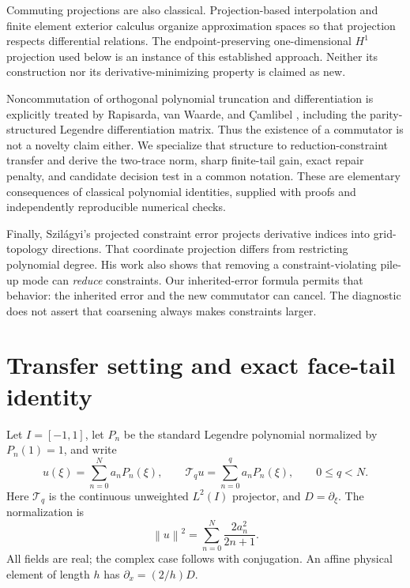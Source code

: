 \documentclass[11pt,a4paper]{article}
\theoremstyle{remark}\newtheorem{remark}[theorem]{Remark}
\newcommand{\norm}[1]{\left\lVert #1\right\rVert}
\newcommand{\T}{\mathcal{T}}
\begin{document}
Commuting projections are also classical. Projection-based interpolation
\cite{demkowicz2005} and finite element exterior calculus \cite{arnold2006}
organize approximation spaces so that projection respects differential
relations. The endpoint-preserving one-dimensional \(H^1\) projection used below
is an instance of this established approach. Neither its construction nor its
derivative-minimizing property is claimed as new.

Noncommutation of orthogonal polynomial truncation and differentiation is
explicitly treated by Rapisarda, van Waarde, and \c{C}amlibel
\cite{rapisarda2024}, including the parity-structured Legendre differentiation
matrix. Thus the existence of a commutator is not a novelty claim either.
We specialize that structure to reduction-constraint transfer and derive the
two-trace norm, sharp finite-tail gain, exact repair penalty, and candidate
decision test in a common notation. These are elementary consequences of
classical polynomial identities, supplied with proofs and independently
reproducible numerical checks.

Finally, Szil\'agyi's projected constraint error \cite[Sec.~6.1.4]{szilagyi2014}
projects derivative indices into grid-topology directions. That coordinate
projection differs from restricting polynomial degree. His work also shows
that removing a constraint-violating pile-up mode can \emph{reduce} constraints.
Our inherited-error formula permits that behavior: the inherited error and the
new commutator can cancel. The diagnostic does not assert that coarsening
always makes constraints larger.

\section{Transfer setting and exact face-tail identity}
\label{sec:identity}
Let \(I=[-1,1]\), let \(P_n\) be the standard Legendre polynomial normalized by
\(P_n(1)=1\), and write
\begin{equation}
 u(\xi)=\sum_{n=0}^{N}a_nP_n(\xi),\qquad
 \T_q u=\sum_{n=0}^{q}a_nP_n(\xi),\qquad 0\le q<N.
 \label{eq:truncation}
\end{equation}
Here \(\T_q\) is the continuous unweighted \(L^2(I)\) projector, and
\(D=\partial_\xi\). The normalization is
\begin{equation}
 \norm{u}^2=\sum_{n=0}^{N}\frac{2a_n^2}{2n+1}.
 \label{eq:norm}
\end{equation}
All fields are real; the complex case follows with conjugation. An affine
physical element of length \(h\) has \(\partial_x=(2/h)D\).
\end{document}
